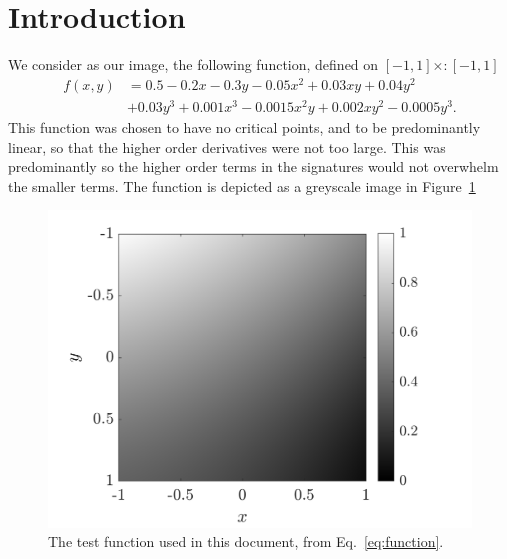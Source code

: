 \documentclass[11pt]{article}
\begin{document}
\section{Introduction}
We consider as our image, the following function, defined on $[-1, 1]
\times:
[-1, 1]$
\begin{equation}\label{eq:function}
  \begin{split}
    f(x, y) &= 0.5 - 0.2x - 0.3y - 0.05x^2 + 0.03xy + 0.04y^2 \\ 
    &+ 0.03y^3 + 0.001x^3 - 0.0015x^2y + 0.002xy^2 - 0.0005y^3.
  \end{split}
\end{equation}
This function was chosen to have no critical points, and to be
predominantly linear, so that the higher order derivatives were not too
large. This was predominantly so the higher order terms in the signatures
would not overwhelm the smaller terms. The function is depicted as a
greyscale image in Figure~\ref{fig:function}
\begin{figure}
  \centering
  \includegraphics[width=12cm]{figures/function}
  \caption{The test function used in this document, from
  Eq.~\eqref{eq:function}.}\label{fig:function}
\end{figure}
\end{document}
